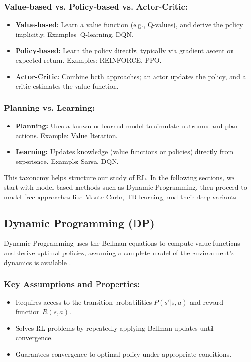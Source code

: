 \documentclass[../Main.tex]{subfiles}
\begin{document}
\subsubsection{Value-based vs. Policy-based vs. Actor-Critic:}
\begin{itemize}
    \item \textbf{Value-based:} Learn a value function (e.g., Q-values), and derive the policy implicitly. Examples: Q-learning, DQN.
    \item \textbf{Policy-based:} Learn the policy directly, typically via gradient ascent on expected return. Examples: REINFORCE, PPO.
    \item \textbf{Actor-Critic:} Combine both approaches; an actor updates the policy, and a critic estimates the value function.
\end{itemize}

\subsubsection{Planning vs. Learning:}
\begin{itemize}
    \item \textbf{Planning:} Uses a known or learned model to simulate outcomes and plan actions. Example: Value Iteration.
    \item \textbf{Learning:} Updates knowledge (value functions or policies) directly from experience. Example: Sarsa, DQN.
\end{itemize}

This taxonomy helps structure our study of RL. In the following sections, we start with model-based methods such as Dynamic Programming, then proceed to model-free approaches like Monte Carlo, TD learning, and their deep variants.

\subsection{Dynamic Programming (DP)}

Dynamic Programming uses the Bellman equations to compute value functions and derive optimal policies, assuming a complete model of the environment's dynamics is available \cite{bellman1957dynamic}.

\subsubsection{Key Assumptions and Properties:}
\begin{itemize}
    \item Requires access to the transition probabilities $P(s'|s, a)$ and reward function $R(s, a)$.
    \item Solves RL problems by repeatedly applying Bellman updates until convergence.
    \item Guarantees convergence to optimal policy under appropriate conditions.
\end{itemize}
\end{document}
